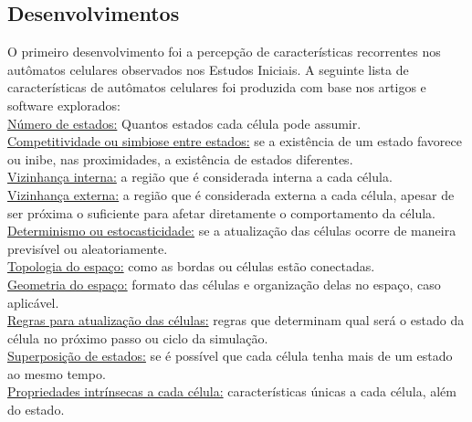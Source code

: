 \documentclass[
	12pt,				%
	openright,			%
	twoside,			%
	a4paper,			%
	english,			%
	french,				%
	spanish,			%
	brazil				%
	]{abntex2}
\begin{document}
\subsection*{Desenvolvimentos}

O primeiro desenvolvimento foi a percepção de características recorrentes nos autômatos celulares observados nos Estudos Iniciais.
A seguinte lista de características de autômatos celulares foi produzida com base nos artigos e software explorados:\\
\underline{Número de estados:} Quantos estados cada célula pode assumir.\\
\underline{Competitividade ou simbiose entre estados:} se a existência de um estado favorece ou inibe, nas proximidades, a existência de estados diferentes.\\
\underline{Vizinhança interna:} a região que é considerada interna a cada célula.\\
\underline{Vizinhança externa:} a região que é considerada externa a cada célula, apesar de ser próxima o suficiente para afetar diretamente o comportamento da célula.\\
\underline{Determinismo ou estocasticidade:} se a atualização das células ocorre de maneira previsível ou aleatoriamente.\\
\underline{Topologia do espaço:} como as bordas ou células estão conectadas.\\
\underline{Geometria do espaço:} formato das células e organização delas no espaço, caso aplicável.\\
\underline{Regras para atualização das células:} regras que determinam qual será o estado da célula no próximo passo ou ciclo da simulação.\\
\underline{Superposição de estados:} se é possível que cada célula tenha mais de um estado ao mesmo tempo.\\
\underline{Propriedades intrínsecas a cada célula:} características únicas a cada célula, além do estado.
\end{document}
